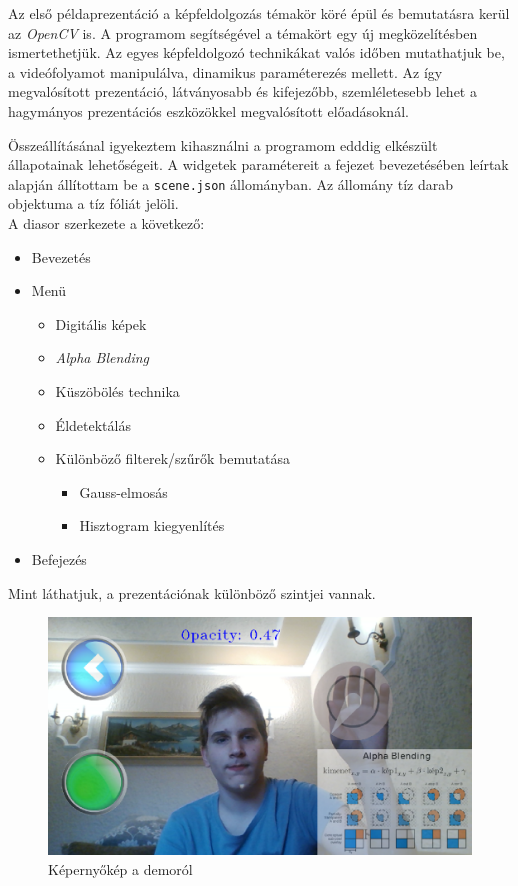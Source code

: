 
Az első példaprezentáció a képfeldolgozás témakör köré épül és bemutatásra kerül az \textit{OpenCV} is. A programom segítségével a témakört egy új megközelítésben ismertethetjük. Az egyes képfeldolgozó technikákat valós időben mutathatjuk be, a videófolyamot manipulálva, dinamikus paraméterezés mellett. Az így megvalósított prezentáció, látványosabb és kifejezőbb, szemléletesebb lehet a hagymányos prezentációs eszközökkel megvalósított előadásoknál.

Összeállításánal igyekeztem kihasználni a programom edddig elkészült állapotainak lehetőségeit. A widgetek paramétereit a fejezet bevezetésében leírtak alapján állítottam be a \texttt{scene.json} állományban. Az állomány tíz darab objektuma a tíz fóliát jelöli.\\
A diasor szerkezete a következő:
\begin{itemize}
	\item Bevezetés
	\item Menü
		\begin{itemize}
			\item Digitális képek
			\item \textit{Alpha Blending}
			\item Küszöbölés technika
			\item Éldetektálás
			\item Különböző filterek/szűrők bemutatása
				\begin{itemize}
					\item Gauss-elmosás
					\item Hisztogram kiegyenlítés
				\end{itemize}
		\end{itemize}
	\item Befejezés
\end{itemize}
Mint láthatjuk, a prezentációnak különböző szintjei vannak.
\begin{figure}[h]
\centering
\includegraphics[width=12truecm]{images/opencv_demo_screenshot.png}
\caption{Képernyőkép a demoról}
\label{fig:opencvdemo}
\end{figure}

